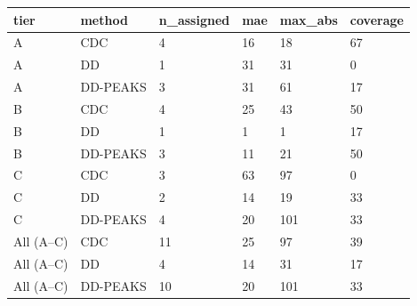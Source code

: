 \begin{tabular}{llllll}
\toprule
tier & method & n_assigned & mae & max_abs & coverage \\
\midrule
A & CDC & 4 & 16 & 18 & 67 \\
A & DD & 1 & 31 & 31 & 0 \\
A & DD-PEAKS & 3 & 31 & 61 & 17 \\
B & CDC & 4 & 25 & 43 & 50 \\
B & DD & 1 & 1 & 1 & 17 \\
B & DD-PEAKS & 3 & 11 & 21 & 50 \\
C & CDC & 3 & 63 & 97 & 0 \\
C & DD & 2 & 14 & 19 & 33 \\
C & DD-PEAKS & 4 & 20 & 101 & 33 \\
All (A--C) & CDC & 11 & 25 & 97 & 39 \\
All (A--C) & DD & 4 & 14 & 31 & 17 \\
All (A--C) & DD-PEAKS & 10 & 20 & 101 & 33 \\
\bottomrule
\end{tabular}
